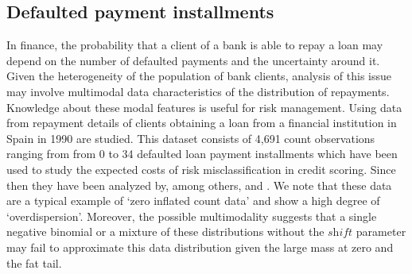 \documentclass[11pt]{article}
\begin{document}
\label{sec:applications}


\subsection{Defaulted payment installments}
In finance, the probability that a client of a bank is able to repay a loan may depend on the number of defaulted payments and the uncertainty around it.  Given the heterogeneity of the population of bank clients, analysis of this issue may involve multimodal data characteristics of the distribution of repayments. Knowledge about these modal features is useful for risk management. Using data from \cite{dionne1996count} repayment details of clients obtaining a loan from a financial institution in Spain in 1990 are studied. This dataset consists of 4,691 count observations ranging from from 0 to 34 defaulted loan payment installments which have been used to study the expected costs of risk misclassification in credit scoring.  Since then they have been analyzed by, among others, \cite{KarlisXekalaki_2001robust} and \cite{Woo20074379}. 
We note that these data are a typical example of `zero inflated count data' and show a high degree of `overdispersion'. Moreover, the possible multimodality suggests that a single negative binomial or a mixture of these distributions without the $\textit{shift}$ parameter may fail to approximate this data distribution given the large mass at zero and the fat tail.


\end{document}
